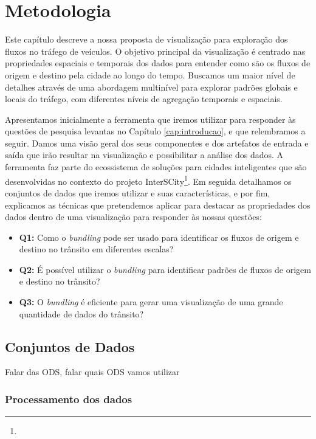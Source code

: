 \chapter{Metodologia}
\label{cap:metodologia}
 Este capítulo descreve a nossa proposta de visualização para exploração dos
fluxos no tráfego de veículos. O objetivo principal da visualização é centrado
nas propriedades espaciais e temporais dos dados para entender como são os
fluxos de origem e destino pela cidade ao longo do tempo. Buscamos um maior
nível de detalhes através de uma abordagem multinível para explorar padrões
globais e locais do tráfego, com diferentes níveis de agregação temporais e
espaciais.

 Apresentamos inicialmente a ferramenta que iremos utilizar para responder às
questões de pesquisa levantas no Capítulo \ref{cap:introducao}, e que
relembramos a seguir. Damos uma visão geral dos seus componentes e dos
artefatos de entrada e saída que irão resultar na visualização e possibilitar a
análise dos dados. A ferramenta faz parte do ecossistema de soluções para
cidades inteligentes que são desenvolvidas no contexto do projeto
InterSCity\footnote{}. Em seguida detalhamos os conjuntos
de dados que iremos utilizar e suas características, e por fim, explicamos as
técnicas que pretendemos aplicar para destacar as propriedades dos dados dentro
de uma visualização para responder às nossas questões:

\begin{itemize}
  \item \textbf{Q1:} Como o \emph{bundling} pode ser usado para identificar os
fluxos de origem e destino no trânsito em diferentes escalas?

  \item \textbf{Q2:} É possível utilizar o \emph{bundling}  para
identificar padrões de fluxos de origem e destino no trânsito?

  \item \textbf{Q3:} O \emph{bundling} é eficiente para gerar uma
visualização de uma grande quantidade de dados do trânsito?
\end{itemize}


\section{Conjuntos de Dados}

Falar das ODS, falar quais ODS vamos utilizar


\subsection{Processamento dos dados}

